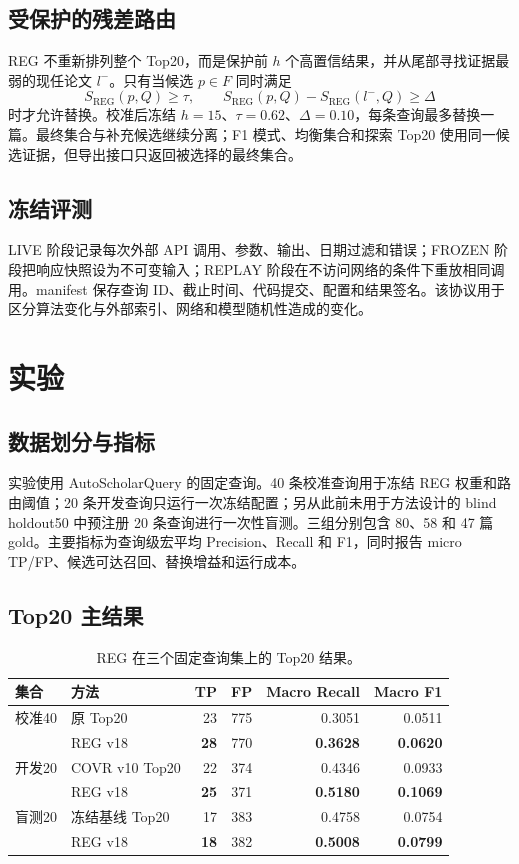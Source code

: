 \documentclass[a4paper,11pt]{ctexart}
\begin{document}
\subsection{受保护的残差路由}
REG 不重新排列整个 Top20，而是保护前 $h$ 个高置信结果，并从尾部寻找证据最弱的现任论文 $l^- $。只有当候选 $p\in F$ 同时满足
\begin{equation}
S_{\mathrm{REG}}(p,Q)\ge \tau,
\qquad
S_{\mathrm{REG}}(p,Q)-S_{\mathrm{REG}}(l^-,Q)\ge \Delta
\end{equation}
时才允许替换。校准后冻结 $h=15$、$\tau=0.62$、$\Delta=0.10$，每条查询最多替换一篇。最终集合与补充候选继续分离；F1 模式、均衡集合和探索 Top20 使用同一候选证据，但导出接口只返回被选择的最终集合。

\subsection{冻结评测}
LIVE 阶段记录每次外部 API 调用、参数、输出、日期过滤和错误；FROZEN 阶段把响应快照设为不可变输入；REPLAY 阶段在不访问网络的条件下重放相同调用。manifest 保存查询 ID、截止时间、代码提交、配置和结果签名。该协议用于区分算法变化与外部索引、网络和模型随机性造成的变化。

\section{实验}
\subsection{数据划分与指标}
实验使用 AutoScholarQuery 的固定查询。40 条校准查询用于冻结 REG 权重和路由阈值；20 条开发查询只运行一次冻结配置；另从此前未用于方法设计的 blind holdout50 中预注册 20 条查询进行一次性盲测。三组分别包含 80、58 和 47 篇 gold。主要指标为查询级宏平均 Precision、Recall 和 F1，同时报告 micro TP/FP、候选可达召回、替换增益和运行成本。

\subsection{Top20 主结果}
\begin{table}[H]
\centering
\caption{REG 在三个固定查询集上的 Top20 结果。}
\begin{tabular}{llrrrr}
\toprule
集合 & 方法 & TP & FP & Macro Recall & Macro F1\\
\midrule
校准40 & 原 Top20 & 23 & 775 & 0.3051 & 0.0511\\
       & REG v18 & \textbf{28} & 770 & \textbf{0.3628} & \textbf{0.0620}\\
开发20 & COVR v10 Top20 & 22 & 374 & 0.4346 & 0.0933\\
       & REG v18 & \textbf{25} & 371 & \textbf{0.5180} & \textbf{0.1069}\\
盲测20 & 冻结基线 Top20 & 17 & 383 & 0.4758 & 0.0754\\
       & REG v18 & \textbf{18} & 382 & \textbf{0.5008} & \textbf{0.0799}\\
\bottomrule
\end{tabular}
\end{table}
\end{document}
